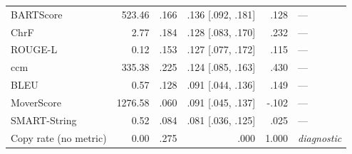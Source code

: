 \begin{table}[t]
\begin{tabular}{@{}lrrrrl@{}}
BARTScore & 523.46 & .166 & .136 {\scriptsize [.092, .181]} & .128 & --- \\
ChrF & 2.77 & .184 & .128 {\scriptsize [.083, .170]} & .232 & --- \\
ROUGE-L & 0.12 & .153 & .127 {\scriptsize [.077, .172]} & .115 & --- \\
ccm & 335.38 & .225 & .124 {\scriptsize [.085, .163]} & .430 & --- \\
BLEU & 0.57 & .128 & .091 {\scriptsize [.044, .136]} & .149 & --- \\
MoverScore & 1276.58 & .060 & .091 {\scriptsize [.045, .137]} & -.102 & --- \\
SMART-String & 0.52 & .084 & .081 {\scriptsize [.036, .125]} & .025 & --- \\
\midrule
Copy rate (no metric) & 0.00 & .275 & .000 & 1.000 & \emph{diagnostic} \\
\bottomrule
\end{tabular}
\end{table}
